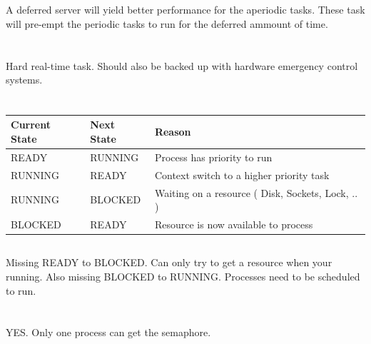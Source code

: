 \documentclass[a4paper,12pt]{article}
\begin{document}
\section{}
A deferred server will yield better performance for the aperiodic tasks.  These task will pre-empt the periodic tasks to run for the deferred ammount of time.

\section{}
Hard real-time task.  Should also be backed up with hardware emergency control systems.

\section{}
\subsection{}
\begin{tabular}{l l | l}
Current State & Next State & Reason \\ \hline
READY & RUNNING & Process has priority to run \\
RUNNING & READY & Context switch to a higher priority task \\ 
RUNNING & BLOCKED & Waiting on a resource ( Disk, Sockets, Lock, .. ) \\
BLOCKED & READY & Resource is now available to process
\end{tabular}

\subsection{}
Missing READY to BLOCKED.  Can only try to get a resource when your running.
Also missing BLOCKED to RUNNING.  Processes need to be scheduled to run.

\section{}
YES.  Only one process can get the semaphore.
\end{document}
